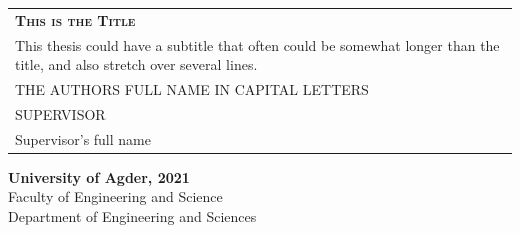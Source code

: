 \begin{titlepage}

\newcommand{\projectTitle}{This is the Title}
\newcommand{\projectSubTitlel}{ This thesis could have a subtitle that often could be somewhat longer than the title, and also stretch over several lines.}
\newcommand{\authors}{THE AUTHORS FULL NAME IN CAPITAL LETTERS}
\newcommand{\supervisor}{Supervisor's full name}

\newcommand{\projectYear}{2021}
\newcommand{\facultyName}{Faculty of Engineering and Science}
\newcommand{\departmentName}{Department of Engineering and Sciences}




\begin{tabular}{p{12cm}}
                                            \\[5cm]
    \LARGE{\textsc{\textbf{\projectTitle}}} \\[1.5cm]
    \projectSubTitlel                       \\[2.5cm]
    \large{\authors}                        \\[9cm]
    \Large{SUPERVISOR}                      \\
    \supervisor
\end{tabular}



\vfill


\textbf{University of Agder, \projectYear} \\
\small{\facultyName \\
\departmentName}
\vspace{1cm}
\end{titlepage}
